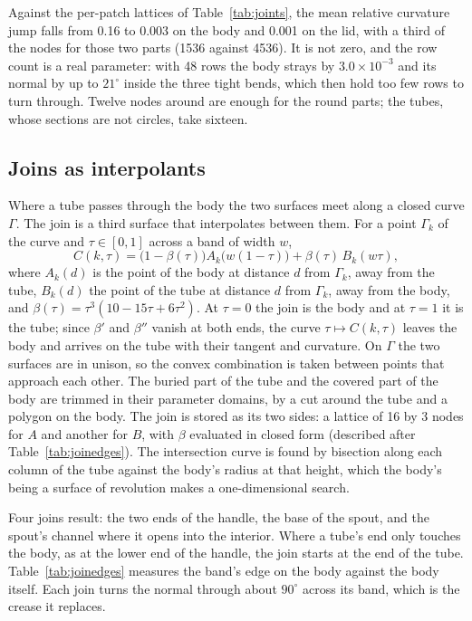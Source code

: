 \documentclass[journal]{IEEEtran}
\begin{document}
Against the per-patch lattices of Table~\ref{tab:joints}, the mean relative
curvature jump falls from 0.16 to 0.003 on the body and 0.001 on the lid,
with a third of the nodes for those two parts (1536 against 4536). It is
not zero, and the row count is a real parameter: with 48 rows the body
strays by $3.0\times10^{-3}$ and its normal by up to $21^\circ$ inside
the three tight bends, which then hold too few rows to turn through.
Twelve nodes around are enough for the round parts; the tubes, whose
sections are not circles, take sixteen.

\subsection{Joins as interpolants}

Where a tube passes through the body the two surfaces meet along a
closed curve $\Gamma$. The join is a third surface that interpolates
between them. For a point $\Gamma_k$ of the curve and $\tau\in[0,1]$
across a band of width $w$,
\begin{equation}
 C(k,\tau)=\bigl(1-\beta(\tau)\bigr)A_k\bigl(w(1-\tau)\bigr)
 +\beta(\tau)\,B_k(w\tau),
 \label{eq:join}
\end{equation}
where $A_k(d)$ is the point of the body at distance $d$ from $\Gamma_k$,
away from the tube, $B_k(d)$ the point of the tube at distance $d$ from
$\Gamma_k$, away from the body, and
$\beta(\tau)=\tau^3(10-15\tau+6\tau^2)$. At $\tau=0$ the join is the
body and at $\tau=1$ it is the tube; since $\beta'$ and $\beta''$ vanish
at both ends, the curve $\tau\mapsto C(k,\tau)$ leaves the body and
arrives on the tube with their tangent and curvature. On $\Gamma$ the two
surfaces are in unison, so the convex combination is taken between points
that approach each other. The buried part of the tube and the covered
part of the body are trimmed in their parameter domains, by a cut around
the tube and a polygon on the body. The join is stored as its two sides:
a lattice of 16 by 3 nodes for $A$ and another for $B$, with $\beta$
evaluated in closed form (described after Table~\ref{tab:joinedges}). The intersection curve
is found by bisection along each column of the tube against the body's
radius at that height, which the body's being a surface of revolution
makes a one-dimensional search.

Four joins result: the two ends of the handle, the base of the spout,
and the spout's channel where it opens into the interior. Where a tube's
end only touches the body, as at the lower end of the handle, the join
starts at the end of the tube. Table~\ref{tab:joinedges} measures the
band's edge on the body against the body itself. Each join turns the
normal through about $90^\circ$ across its band, which is the crease it
replaces.
\end{document}
